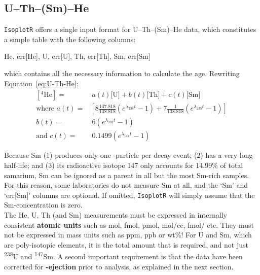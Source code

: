 \begin{refsection}

\chapter{U--Th--(Sm)--He}\label{ch:UThHe}

\texttt{IsoplotR} offers a single input format for U--Th--(Sm)--He
data, which constitutes a simple table with the following columns:

\begin{center}
He, err[He], U, err[U], Th, err[Th], Sm, err[Sm]
\end{center}

\noindent which contains all the necessary information to calculate
the age. Rewriting Equation~\ref{eq:U-Th-He}:
\begin{equation}
\begin{split}
  \left[^4\mbox{He}\right] = & ~a(t) 
   \mbox{[U]} + b(t)\mbox{[Th]} + c(t)\mbox{[Sm]} \\
   \mbox{where~} a(t) = &
   \left[8 \frac{137.818}{138.818} (e^{\lambda_{238}t} - 1) +
     7 \frac{1}{138.818} (e^{\lambda_{235}t} - 1) \right] \\
   b(t) = & ~6 (e^{\lambda_{232}t} - 1)\\
    \mbox{and~} c(t) = & ~0.1499 (e^{\lambda_{147}t} - 1)
\end{split}
\label{eq:UThHe2}
\end{equation}

Because Sm (1) produces only one \textalpha-particle per decay event;
(2) has a very long half-life; and (3) its radioactive isotope 147
only accounts for 14.99\% of total samarium, Sm can be ignored as a
parent in all but the most Sm-rich samples. For this reason, some
laboratories do not measure Sm at all, and the `Sm' and `err[Sm]'
columns are optional. If omitted, \texttt{IsoplotR} will simply assume
that the Sm-concentration is zero.\\

The He, U, Th (and Sm) measurements must be expressed in internally
consistent \textbf{atomic units} such as mol, fmol, pmol, mol/cc,
fmol/ etc. They must not be expressed in mass units such as
ppm, ppb or wt\%! For U and Sm, which are poly-isotopic elements, it
is the total amount that is required, and not just
\textsuperscript{238}U and \textsuperscript{147}Sm. A second important
requirement is that the data have been corrected for
\textbf{\textalpha-ejection} prior to analysis, as explained in the
next section.


\end{refsection}

